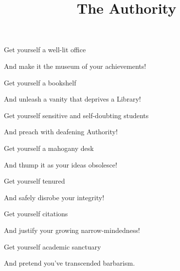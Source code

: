 \documentclass{article}
\title{The Authority}
\begin{document}
 \newline

Get yourself a well-lit office \newline

And make it the museum of your achievements!\newline\newline

Get yourself a bookshelf\newline

And unleash a vanity that deprives a Library!\newline\newline

Get yourself sensitive and self-doubting students\newline

And preach with deafening Authority!\newline\newline

Get yourself a mahogany desk\newline

And thump it as your ideas obsolesce!\newline\newline

Get yourself tenured\newline

And safely disrobe your integrity!\newline\newline

Get yourself citations\newline

And justify your growing narrow-mindedness!\newlin\newlinee

Get yourself academic sanctuary\newline

And pretend you've transcended barbarism.\newline\newline
\end{document}

